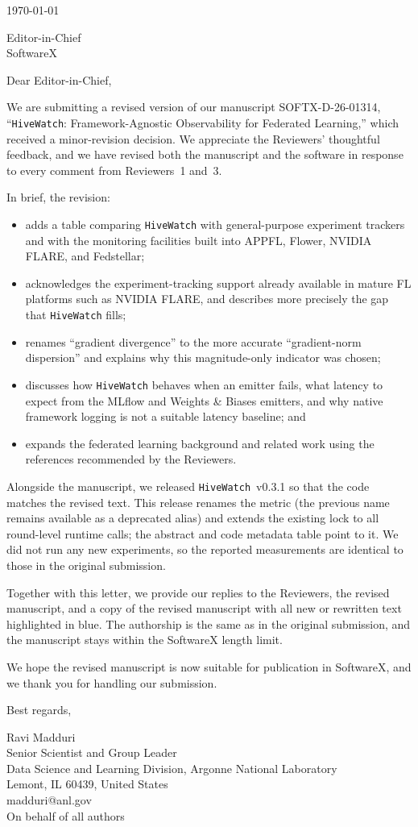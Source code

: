 \documentclass[10pt]{letter}
\begin{document}
\today

Editor-in-Chief\\
SoftwareX

Dear Editor-in-Chief,

We are submitting a revised version of our manuscript SOFTX-D-26-01314, ``\texttt{HiveWatch}: Framework-Agnostic Observability for Federated Learning,'' which received a minor-revision decision. We appreciate the Reviewers' thoughtful feedback, and we have revised both the manuscript and the software in response to every comment from Reviewers~1 and~3.

In brief, the revision:
\begin{itemize}
    \setlength{\itemsep}{0pt}
    \item adds a table comparing \texttt{HiveWatch} with general-purpose experiment trackers and with the monitoring facilities built into APPFL, Flower, NVIDIA FLARE, and Fedstellar;
    \item acknowledges the experiment-tracking support already available in mature FL platforms such as NVIDIA FLARE, and describes more precisely the gap that \texttt{HiveWatch} fills;
    \item renames ``gradient divergence'' to the more accurate ``gradient-norm dispersion'' and explains why this magnitude-only indicator was chosen;
    \item discusses how \texttt{HiveWatch} behaves when an emitter fails, what latency to expect from the MLflow and Weights \& Biases emitters, and why native framework logging is not a suitable latency baseline; and
    \item expands the federated learning background and related work using the references recommended by the Reviewers.
\end{itemize}

Alongside the manuscript, we released \texttt{HiveWatch}~v0.3.1 so that the code matches the revised text. This release renames the metric (the previous name remains available as a deprecated alias) and extends the existing lock to all round-level runtime calls; the abstract and code metadata table point to it. We did not run any new experiments, so the reported measurements are identical to those in the original submission.

Together with this letter, we provide our replies to the Reviewers, the revised manuscript, and a copy of the revised manuscript with all new or rewritten text highlighted in blue. The authorship is the same as in the original submission, and the manuscript stays within the SoftwareX length limit.

We hope the revised manuscript is now suitable for publication in SoftwareX, and we thank you for handling our submission.

Best regards,

Ravi Madduri\\
Senior Scientist and Group Leader\\
Data Science and Learning Division, Argonne National Laboratory\\
Lemont, IL 60439, United States\\
madduri@anl.gov\\
On behalf of all authors
\end{document}
